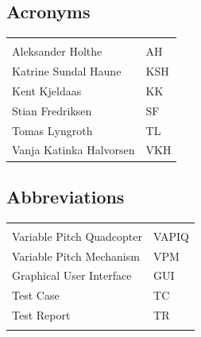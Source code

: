 \documentclass{article}
\begin{document}
\begin{center}
\section*{\textbf{Acronyms}}
\begin{tabular}{ll}
\rowcolor{cadetgrey}
    &   \\
Aleksander Holthe      & AH     
 \\\rowcolor{gainsboro}
Katrine Sundal Haune  & KSH \\
Kent Kjeldaas         & KK 
 \\\rowcolor{gainsboro}
Stian Fredriksen      & SF  \\
Tomas Lyngroth       & TL   
 \\\rowcolor{gainsboro}
Vanja Katinka Halvorsen     & VKH   \\
\end{tabular}                                                             
\end{center}

\vspace*{0.5 cm}
\begin{center}
\section*{\textbf{Abbreviations}}
\begin{tabular}{ll}
\rowcolor{cadetgrey}
    &   \\
Variable Pitch Quadcopter & VAPIQ\\\rowcolor{gainsboro}
Variable Pitch Mechanism & VPM \\
Graphical User Interface & GUI \\ \rowcolor{gainsboro}
Test Case & TC \\
Test Report &TR \\ \rowcolor{gainsboro}

\end{tabular}                                                             
\end{center}


\newpage


\tableofcontents
\listoffigures
\listoftables
\newpage













\end{document}
